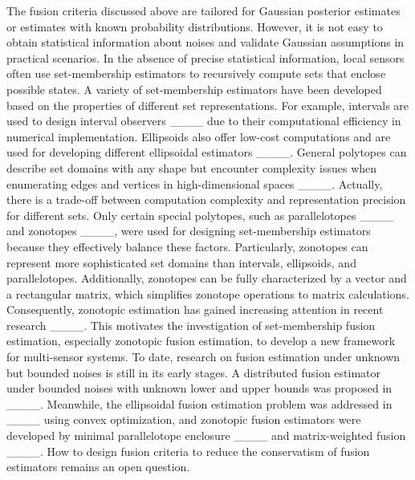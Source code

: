 	The fusion criteria discussed above are tailored for Gaussian posterior estimates or estimates with known probability distributions. However, it is not easy to obtain statistical information about noises and validate Gaussian assumptions in practical scenarios. In the absence of precise statistical information, local sensors often use set-membership estimators to recursively compute sets that enclose possible states. A variety of set-membership estimators have been developed based on the properties of different set representations. For example, intervals are used to design interval observers ____ due to their computational efficiency in numerical implementation. Ellipsoids also offer low-cost computations and are used for developing different ellipsoidal estimators ____. General polytopes can describe set domains with any shape but encounter complexity issues when enumerating edges and vertices in high-dimensional spaces {____}. Actually, there is a trade-off between computation complexity and representation precision for different sets. Only certain special polytopes, such as parallelotopes ____ and zonotopes ____, were used for designing set-membership estimators because they effectively balance these factors. Particularly, zonotopes can represent more sophisticated set domains than intervals, ellipsoids, and parallelotopes. Additionally, zonotopes can be fully characterized by a vector and a rectangular matrix, which simplifies zonotope operations to matrix calculations. Consequently, zonotopic estimation has gained increasing attention in recent research ____. This motivates the investigation of set-membership fusion estimation, especially zonotopic fusion estimation, to develop a new framework for multi-sensor systems. To date, research on fusion estimation under unknown but bounded noises is still in its early stages. A distributed fusion estimator under bounded noises with unknown lower and upper bounds was proposed in ____. Meanwhile, the ellipsoidal fusion estimation problem was addressed in ____ using convex optimization, and zonotopic fusion estimators were developed by minimal parallelotope enclosure ____ and matrix-weighted fusion ____. How to design fusion criteria to reduce the conservatism of fusion estimators remains an open question.
		
